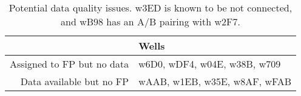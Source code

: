 \begin{table}[ht]
\centering
\begin{tabular}{rl}
  \hline
 & Wells \\ 
  \hline
Assigned to FP but no data & w6D0, wDF4, w04E, w38B, w709 \\ 
  Data available but no FP & wAAB, w1EB, w35E, w8AF, wFAB \\ 
   \hline
\end{tabular}
\caption{Potential data quality issues. w3ED is known to be not connected, and wB98 has an A/B pairing with w2F7.} 
\label{tab:quality}
\end{table}
